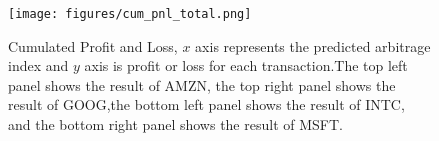 \begin{figure}[hbtp]
  \begin{center}
    \texttt{[image: figures/cum\_pnl\_total.png]}
  \end{center}
\caption{Cumulated Profit and Loss,  $x$ axis represents the predicted arbitrage index and $y$ axis is profit or loss for each transaction.The top left panel shows the result of AMZN, the top right panel shows the result of GOOG,the bottom left panel shows the result of INTC, and the bottom right panel shows the result of MSFT. } \label{fig:cum_pnl}
\end{figure}
				